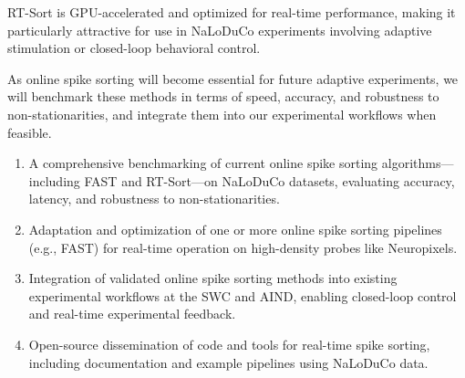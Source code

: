 RT-Sort is GPU-accelerated and optimized for real-time performance, making it particularly attractive for use in NaLoDuCo experiments involving adaptive stimulation or closed-loop behavioral control.

As online spike sorting will become essential for future adaptive experiments, we will benchmark these methods in terms of speed, accuracy, and robustness to non-stationarities, and integrate them into our experimental workflows when feasible.


\begin{enumerate}
    \item A comprehensive benchmarking of current online spike sorting algorithms—including FAST and RT-Sort—on NaLoDuCo datasets, evaluating accuracy, latency, and robustness to non-stationarities.
    
    \item Adaptation and optimization of one or more online spike sorting pipelines (e.g., FAST) for real-time operation on high-density probes like Neuropixels.

    \item Integration of validated online spike sorting methods into existing experimental workflows at the SWC and AIND, enabling closed-loop control and real-time experimental feedback.

    \item Open-source dissemination of code and tools for real-time spike sorting, including documentation and example pipelines using NaLoDuCo data.
\end{enumerate}

